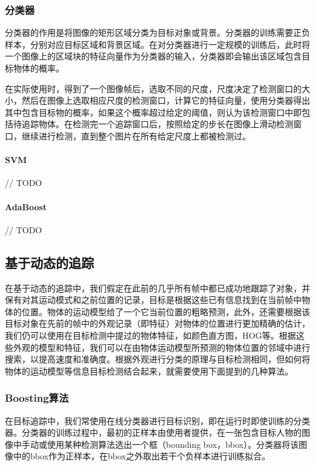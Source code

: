 \subsubsection{分类器}

  分类器的作用是将图像的矩形区域分类为目标对象或背景。分类器的训练需要正负样本，分别对应目标区域和背景区域。在对分类器进行一定规模的训练后，此时将一个图像上的区域块的特征向量作为分类器的输入，分类器即会输出该区域包含目标物体的概率。

  在实际使用时，得到了一个图像帧后，选取不同的尺度，尺度决定了检测窗口的大小，然后在图像上选取相应尺度的检测窗口，计算它的特征向量，使用分类器得出其中包含目标物的概率，如果这个概率超过给定的阈值，则认为该检测窗口中即包括待追踪物体。在检测完一个追踪窗口后，按照给定的步长在图像上滑动检测窗口，继续进行检测，直到整个图片在所有给定尺度上都被检测过。

\paragraph{SVM}

// TODO

\paragraph{AdaBoost}

// TODO


\subsection{基于动态的追踪}

  在基于动态的追踪中，我们假定在此前的几乎所有帧中都已成功地跟踪了对象，并保有对其运动模式和之前位置的记录，目标是根据这些已有信息找到在当前帧中物体的位置。物体的运动模型给了一个它当前位置的粗略预测，此外，还需要根据该目标对象在先前的帧中的外观记录（即特征）对物体的位置进行更加精确的估计，我们仍可以使用在目标检测中提过的物体特征，如颜色直方图，HOG等。根据这些外观的模型和特征，我们可以在由物体运动模型所预测的物体位置的邻域中进行搜索，以提高速度和准确度。根据外观进行分类的原理与目标检测相同，但如何将物体的运动模型等信息目标检测结合起来，就需要使用下面提到的几种算法。

\subsubsection{Boosting算法}
  在目标追踪中，我们常使用在线分类器进行目标识别，即在运行时即使训练的分类器。分类器的训练过程中，最初的正样本由使用者提供，在一张包含目标人物的图像中手动或使用某种检测算法选出一个框（bounding box，bbox）。分类器将该图像中的bbox作为正样本，在bbox之外取出若干个负样本进行训练拟合。

